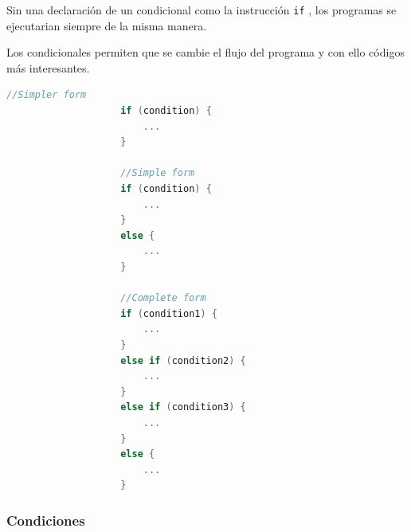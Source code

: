 \documentclass[12pt, fleqn]{report}                             %
\theoremstyle{break}                                            %
\newcommand{\textCode}[1]  { \texttt{#1} }                      %
\begin{document}
                Sin una declaración de un condicional como la instrucción \textCode{if}, los programas
                se ejecutarian siempre de la misma manera.
                
                Los condicionales permiten que se cambie el flujo del programa y con ello códigos
                más interesantes.
                \begin{lstlisting}[language=C++, gobble=20]
                    //Simpler form
                    if (condition) {
                        ...
                    }

                    //Simple form
                    if (condition) {
                        ...
                    }
                    else {
                        ...
                    }
                    
                    //Complete form
                    if (condition1) {
                        ...
                    }
                    else if (condition2) {
                        ...
                    }
                    else if (condition3) {
                        ...
                    }
                    else {
                        ...
                    }
                \end{lstlisting}


                \clearpage
                \subsubsection{Condiciones}
\end{document}
